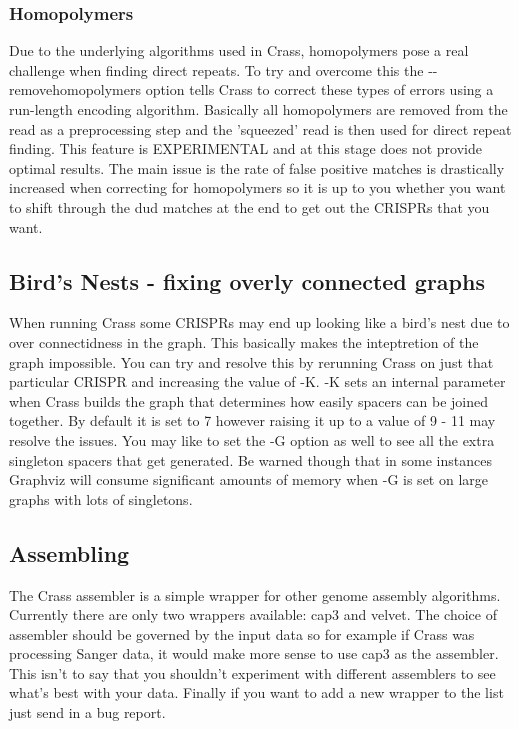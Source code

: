 \documentclass[11pt]{article} %
\begin{document}
\subsubsection{Homopolymers}
Due to the underlying algorithms used in Crass, homopolymers pose a real challenge when finding direct repeats.  To try and overcome this the -{}-removehomopolymers option tells Crass to correct these types of errors using a run-length encoding algorithm.  Basically all homopolymers are removed from the read as a preprocessing step and the 'squeezed' read is then used for direct repeat finding.  This feature is EXPERIMENTAL and at this stage does not provide optimal results.  The main issue is the rate of false positive matches is drastically increased when correcting for homopolymers so it is up to you whether you want to shift through the dud matches at the end to get out the CRISPRs that you want.  
\subsection{Bird's Nests - fixing overly connected graphs}
When running Crass some CRISPRs may end up looking like a bird's nest due to over connectidness in the graph.  This basically makes the inteptretion of the graph impossible.  You can try and resolve this by rerunning Crass on just that particular CRISPR and increasing the value of -K.  -K sets an internal parameter when Crass builds the graph that determines how easily spacers can be joined together.  By default it is set to 7 however raising it up to a value of 9 - 11 may resolve the issues.  You may like to set the -G option as well to see all the extra singleton spacers that get generated.  Be warned though that in some instances Graphviz will consume significant amounts of memory when -G is set on large graphs with lots of singletons.
\subsection{Assembling}
The Crass assembler is a simple wrapper for other genome assembly algorithms.  Currently there are only two wrappers available: cap3 and velvet.  The choice of assembler should be governed by the input data so for example if Crass was processing Sanger data, it would make more sense to use cap3 as the assembler.  This isn't to say that you shouldn't experiment with different assemblers to see what's best with your data.  Finally if you want to add a new wrapper to the list just send in a bug report.
\end{document}
